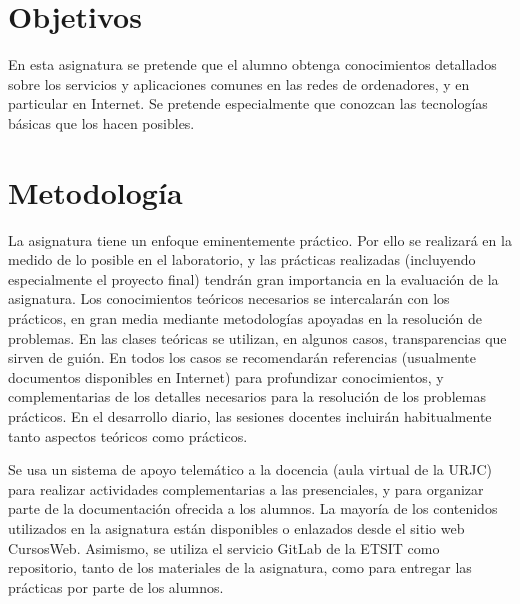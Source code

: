 \documentclass[a4paper,12pt]{article}
\begin{document}
\section{Objetivos}

En esta asignatura se pretende que el alumno obtenga conocimientos detallados sobre los servicios y aplicaciones comunes en las redes de ordenadores, y en particular en Internet. Se pretende especialmente que conozcan las tecnologías básicas que los hacen posibles.

\section{Metodología}

La asignatura tiene un enfoque eminentemente práctico. Por ello se realizará en la medido de lo posible en el laboratorio, y las prácticas realizadas (incluyendo especialmente el proyecto final) tendrán gran importancia en la evaluación de la asignatura. Los conocimientos teóricos necesarios se intercalarán con los prácticos, en gran media mediante metodologías apoyadas en la resolución de problemas. En las clases teóricas se utilizan, en algunos casos, transparencias que sirven de guión. En todos los casos se recomendarán referencias (usualmente documentos disponibles en Internet) para profundizar conocimientos, y complementarias de los detalles necesarios para la resolución de los problemas prácticos. En el desarrollo diario, las sesiones docentes incluirán habitualmente tanto aspectos teóricos como prácticos.

Se usa un sistema de apoyo telemático a la docencia (aula virtual de la URJC) para realizar actividades complementarias a las presenciales, y para organizar parte de la documentación ofrecida a los alumnos. La mayoría de los contenidos utilizados en la asignatura están disponibles o enlazados desde el sitio web CursosWeb. Asimismo, se utiliza el servicio GitLab de la ETSIT como repositorio, tanto de los materiales de la asignatura, como para entregar las prácticas por parte de los alumnos.

\newpage

\end{document}
